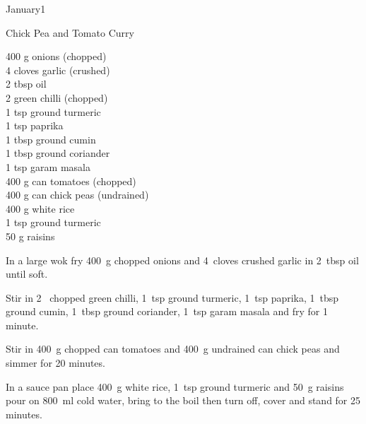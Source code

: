 \begin{menu}{January1}
    \begin{recipe}{2}{Chick Pea and Tomato Curry}%
		\begin{ingredients}
		400 g onions (chopped) \\
	4 cloves garlic (crushed) \\
	2 tbsp oil  \\
	2  green chilli (chopped) \\
	1 tsp ground turmeric  \\
	1 tsp paprika  \\
	1 tbsp ground cumin  \\
	1 tbsp ground coriander  \\
	1 tsp garam masala  \\
	400 g can tomatoes (chopped) \\
	400 g can chick peas (undrained) \\
	400 g white rice  \\
	1 tsp ground turmeric  \\
	50 g raisins  \\
	
		\end{ingredients}
	
	
	
    \begin{instructions}
    \item 
        In a large wok fry
        400~g chopped onions
        and
        4~cloves crushed garlic
        in
        2~tbsp  oil
        until soft.
      \item 
        Stir in
        2~ chopped green chilli,
        1~tsp  ground turmeric,
        1~tsp  paprika,
        1~tbsp  ground cumin,
        1~tbsp  ground coriander,
        1~tsp  garam masala
        and fry for 1 minute.
      \item 
        Stir in
        400~g chopped can tomatoes
        and
        400~g undrained can chick peas
        and simmer for 20 minutes.
      \item 
    In a
    sauce pan
    place
    400~g  white rice,
    1~tsp  ground turmeric
    and
    50~g  raisins
    pour on
    800~ml  cold water,
    bring to the boil then turn off, cover and stand for 25 minutes.
  
    \end{instructions}
    \end{recipe}%
  

\end{menu}
